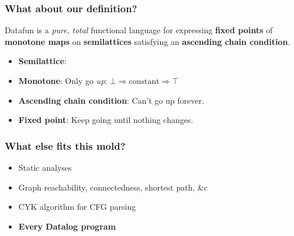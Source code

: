 \documentclass{beamer}
\begin{document}

\begin{frame}
  \frametitle{What about our definition?}

  {\footnotesize\color{gray} Datafun is a \emph{pure}, \emph{total} functional
    language for expressing \textbf{\color{black} fixed points} of
    \textbf{\color{black} monotone maps} on \textbf{\color{black} semilattices}
    satisfying an \textbf{\color{black} ascending chain condition}.}

  \vspace{0.5em}

  \begin{itemize}
  \item \textbf{Semilattice}:\\

    \begin{center}
    \end{center}

  \item \textbf{Monotone}: Only go \emph{up}: $\bot \Rightarrow \text{constant} \Rightarrow \top$
  \item \textbf{Ascending chain condition}: Can't go up forever.
  \item \textbf{Fixed point}: Keep going until nothing changes.
  \end{itemize}

\end{frame}


\begin{frame}
  \frametitle{What else fits this mold?}

  \begin{itemize}
  \item Static analyses
  \item Graph reachability, connectedness, shortest path, \&c
  \item CYK algorithm for CFG parsing
  \item \textbf{Every Datalog program}
  \end{itemize}
\end{frame}
\end{document}
